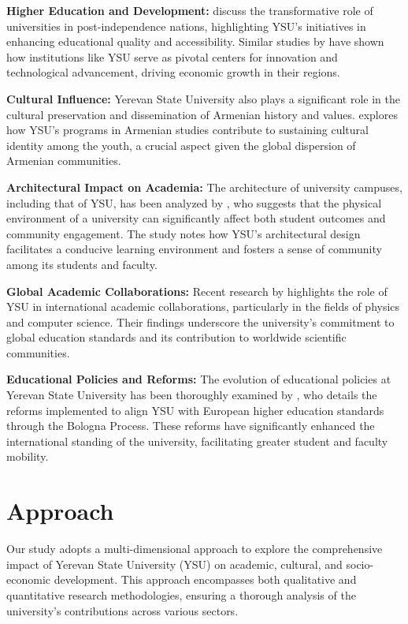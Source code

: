 \documentclass[12pt,onecolumn]{article}
\begin{document}
\textbf{Higher Education and Development:} \cite{smith2018transformation} discuss the transformative role of universities in post-independence nations, highlighting YSU's initiatives in enhancing educational quality and accessibility. Similar studies by \cite{oconnor2020innovation} have shown how institutions like YSU serve as pivotal centers for innovation and technological advancement, driving economic growth in their regions.

\textbf{Cultural Influence:} Yerevan State University also plays a significant role in the cultural preservation and dissemination of Armenian history and values. \cite{karapetyan2019cultural} explores how YSU's programs in Armenian studies contribute to sustaining cultural identity among the youth, a crucial aspect given the global dispersion of Armenian communities.

\textbf{Architectural Impact on Academia:} The architecture of university campuses, including that of YSU, has been analyzed by \cite{carter2021architectural}, who suggests that the physical environment of a university can significantly affect both student outcomes and community engagement. The study notes how YSU’s architectural design facilitates a conducive learning environment and fosters a sense of community among its students and faculty.

\textbf{Global Academic Collaborations:} Recent research by \cite{zhang2022global} highlights the role of YSU in international academic collaborations, particularly in the fields of physics and computer science. Their findings underscore the university's commitment to global education standards and its contribution to worldwide scientific communities.

\textbf{Educational Policies and Reforms:} The evolution of educational policies at Yerevan State University has been thoroughly examined by \cite{ghazaryan2023educational}, who details the reforms implemented to align YSU with European higher education standards through the Bologna Process. These reforms have significantly enhanced the international standing of the university, facilitating greater student and faculty mobility.


\clearpage
\section{Approach}

Our study adopts a multi-dimensional approach to explore the comprehensive impact of Yerevan State University (YSU) on academic, cultural, and socio-economic development. This approach encompasses both qualitative and quantitative research methodologies, ensuring a thorough analysis of the university's contributions across various sectors.
\end{document}
